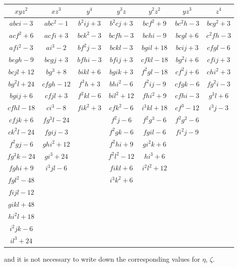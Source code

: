 \documentclass[12pt,a4paper]{article}
\begin{document}
\begin{center}
\small
\begin{tabular}{|c|c|c|c|c|c|c|}
\hline
$xyz^2$ & $xz^3$ & $y^4$ & $y^3z$ & $y^2z^2$ & $yz^3$ & $z^4$ \\
\hline
$abci - 3$ & $abc^2 - 1$ & $b^2ij + 3$ & $b^2cj + 3$ & $bcf^2 + 9$ & $bc^2h - 3$ & $bcg^2 + 3$ \\
$acf^2 + 6$ & $acfi + 3$ & $bck^2 - 3$ & $bcfh - 3$ & $bchi - 9$ & $bcgl + 6$ & $c^2fh - 3$ \\
$afi^2 - 3$ & $ai^3 - 2$ & $bf^2j - 3$ & $bckl - 3$ & $bgil + 18$ & $bcij + 3$ & $cfgl - 6$ \\
$begh - 9$ & $bcgj + 3$ & $bfhi - 3$ & $bfij + 3$ & $cfkl - 18$ & $bg^2i + 6$ & $cfij + 3$ \\
$bcjl + 12$ & $bg^3 + 8$ & $bikl + 6$ & $bgik + 3$ & $f^2gl - 18$ & $cf^2j + 6$ & $chi^2 + 3$ \\
$bg^2l + 24$ & $cfgh - 12$ & $f^3h + 3$ & $bhi^2 - 6$ & $f^2ij - 9$ & $cfgk - 6$ & $fg^2i - 3$ \\
$bgij + 6$ & $cfjl + 3$ & $f^2kl - 6$ & $bil^2 + 12$ & $fhi^2 + 9$ & $cfhi - 3$ & $g^3l + 6$ \\
$cfhl - 18$ & $ci^3 - 8$ & $fik^2 + 3$ & $cfk^2 - 6$ & $i^3kl + 18$ & $cf^3 - 12$ & $i^3j - 3$ \\
$cfjk + 6$ & $fg^3l - 24$ & & $f^2j - 6$ & $f^2g^3 - 6$ & $f^2g^2 - 6$ & \\
$ck^2l - 24$ & $fgij - 3$ & & $f^2gk - 6$ & $fgil - 6$ & $fi^2j - 9$ & \\
$f^2gj - 6$ & $ghi^2 + 12$ & & $f^2hi + 9$ & $gi^2k + 6$ & & \\
$fg^3k - 24$ & $gi^3 + 24$ & & $f^2l^2 - 12$ & $hi^3 + 6$ & & \\
$fghi + 9$ & $i^3jl - 6$ & & $fikl + 6$ & $i^2l^2 + 12$ & & \\
$fgl^2 - 48$ & & & $i^3k^2 + 6$ & & & \\
$fijl - 12$ & & & & & & \\
$gikl + 48$ & & & & & & \\
$hi^2l + 18$ & & & & & & \\
$i^2jk - 6$ & & & & & & \\
$il^3 + 24$ & & & & & & \\
\hline
\end{tabular}
\end{center}
and it is not necessary to write down the corresponding values for $\eta$, $\zeta$.


\end{document}
